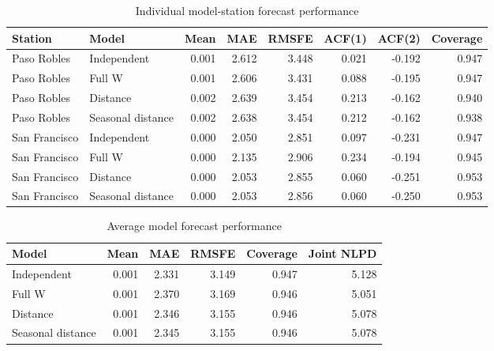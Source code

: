 \documentclass[
  10pt,
]{article}
\begin{document}
\begin{table}

\caption{\label{tab:tbl_perf_indiv}Individual model-station forecast performance\label{tbl:perf_indiv}}
\centering
\begin{tabular}[t]{llrrrrrr}
\toprule
Station & Model & Mean & MAE & RMSFE & ACF(1) & ACF(2) & Coverage\\
\midrule
Paso Robles & Independent & 0.001 & 2.612 & 3.448 & 0.021 & -0.192 & 0.947\\
Paso Robles & Full W & 0.001 & 2.606 & 3.431 & 0.088 & -0.195 & 0.947\\
Paso Robles & Distance & 0.002 & 2.639 & 3.454 & 0.213 & -0.162 & 0.940\\
Paso Robles & Seasonal distance & 0.002 & 2.638 & 3.454 & 0.212 & -0.162 & 0.938\\
San Francisco & Independent & 0.000 & 2.050 & 2.851 & 0.097 & -0.231 & 0.947\\
San Francisco & Full W & 0.000 & 2.135 & 2.906 & 0.234 & -0.194 & 0.945\\
San Francisco & Distance & 0.000 & 2.053 & 2.855 & 0.060 & -0.251 & 0.953\\
San Francisco & Seasonal distance & 0.000 & 2.053 & 2.856 & 0.060 & -0.250 & 0.953\\
\bottomrule
\end{tabular}
\end{table}

\begin{table}

\caption{\label{tab:tbl_perf_avg}Average model forecast performance\label{tbl:perf_avg}}
\centering
\begin{tabular}[t]{lrrrrr}
\toprule
Model & Mean & MAE & RMSFE & Coverage & Joint NLPD\\
\midrule
Independent & 0.001 & 2.331 & 3.149 & 0.947 & 5.128\\
Full W & 0.001 & 2.370 & 3.169 & 0.946 & 5.051\\
Distance & 0.001 & 2.346 & 3.155 & 0.946 & 5.078\\
Seasonal distance & 0.001 & 2.345 & 3.155 & 0.946 & 5.078\\
\bottomrule
\end{tabular}
\end{table}
\end{document}
